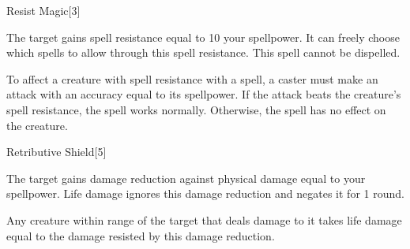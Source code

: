 \begin{spellsection}{Resist Magic}[3]
    \begin{spellheader}
    \end{spellheader}
    \begin{spellcontent}
        \begin{spelltargetinginfo}
        \end{spelltargetinginfo}
        \begin{spelleffects}
            \spelleffect The target gains spell resistance equal to 10 \add your spellpower.
            It can freely choose which spells to allow through this spell resistance.
            \spelldur \durshort
            \spellspecial This spell cannot be dispelled.
        \end{spelleffects}
    \end{spellcontent}
    \begin{spellfooter}
        \spellnotes To affect a creature with spell resistance with a spell, a caster must make an attack with an accuracy equal to its spellpower. If the attack beats the creature's spell resistance, the spell works normally. Otherwise, the spell has no effect on the creature.
        \miscastrandom
    \end{spellfooter}
\end{spellsection}

\begin{spellsection}{Retributive Shield}[5]
    \begin{spellheader}
    \end{spellheader}
    \begin{spellcontent}
        \begin{spelltargetinginfo}
        \end{spelltargetinginfo}
        \begin{spelleffects}
            \spelleffect The target gains damage reduction against physical damage equal to your spellpower. Life damage ignores this damage reduction and negates it for 1 round.

            \par Any creature within \rngmed range of the target that deals damage to it takes life damage equal to the damage resisted by this damage reduction.
            \spelldur \durshort
        \end{spelleffects}
    \end{spellcontent}
    \begin{spellfooter}
        \miscastrandom
    \end{spellfooter}
\end{spellsection}

